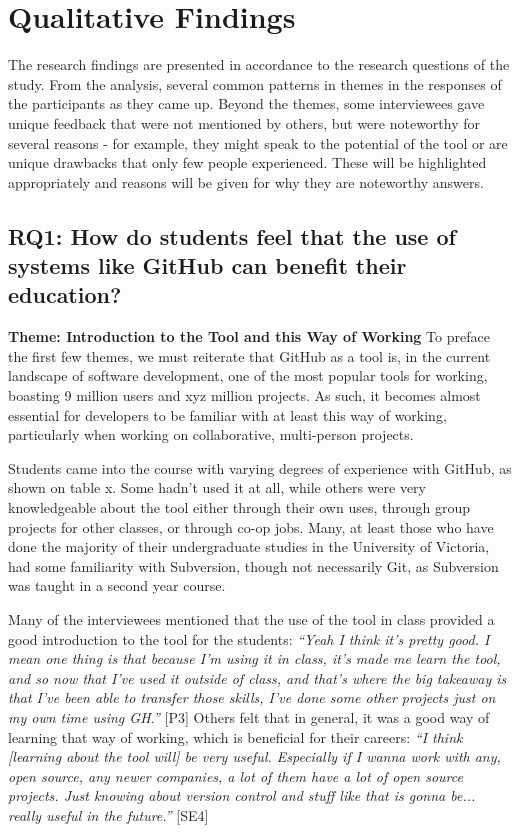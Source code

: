 

\section{Qualitative Findings}

The research findings are presented in accordance to the research questions of the study. From the analysis, several common patterns in themes in the responses of the participants as they came up. Beyond the themes, some interviewees gave unique feedback that were not mentioned by others, but were noteworthy for several reasons - for example, they might speak to the potential of the tool or are unique drawbacks that only few people experienced. These will be highlighted appropriately and reasons will be given for why they are noteworthy answers.


\subsection{RQ1: How do students feel that the use of systems like GitHub can benefit their education?}
\textbf{Theme: Introduction to the Tool and this Way of Working} \break
To preface the first few themes, we must reiterate that GitHub as a tool is, in the current landscape of software development, one of the most popular tools for working, boasting 9 million users and xyz million projects. As such, it becomes almost essential for developers to be familiar with at least this way of working, particularly when working on collaborative, multi-person projects.

Students came into the course with varying degrees of experience with GitHub, as shown on table x. Some hadn't used it at all, while others were very knowledgeable about the tool either through their own uses, through group projects for other classes, or through co-op jobs. Many, at least those who have done the majority of their undergraduate studies in the University of Victoria, had some familiarity with Subversion, though not necessarily Git, as Subversion was taught in a second year course.

Many of the interviewees mentioned that the use of the tool in class provided a good introduction to the tool for the students: \textit{``Yeah I think it's pretty good. I mean one thing is that because I'm using it in class, it's made me learn the tool, and so now that I've used it outside of class, and that's where the big takeaway is that I've been able to transfer those skills, I've done some other projects just on my own time using GH.''} [P3] Others felt that in general, it was a good way of learning that way of working, which is beneficial for their careers: \textit{``I think [learning about the tool will] be very useful. Especially if I wanna work with any, open source, any newer companies, a lot of them have a lot of open source projects. Just knowing about version control and stuff like that is gonna be... really useful in the future.''} [SE4]

